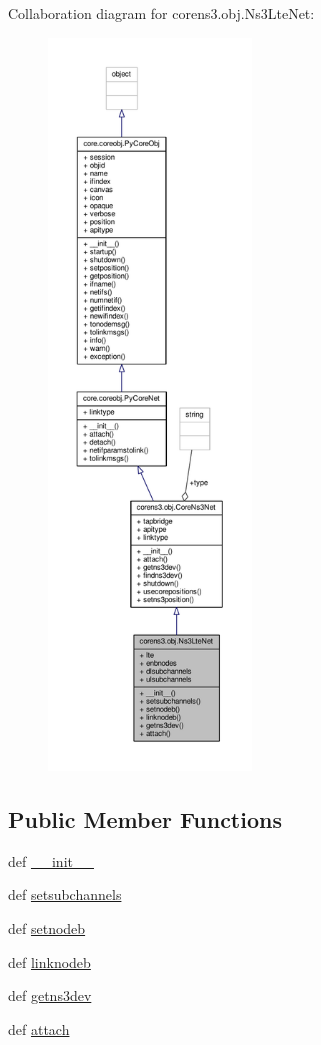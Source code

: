 Collaboration diagram for corens3.\+obj.\+Ns3\+Lte\+Net\+:
\nopagebreak
\begin{figure}[H]
\begin{center}
\leavevmode
\includegraphics[height=550pt]{classcorens3_1_1obj_1_1_ns3_lte_net__coll__graph}
\end{center}
\end{figure}
\subsection*{Public Member Functions}
\begin{DoxyCompactItemize}
\item 
def \hyperlink{classcorens3_1_1obj_1_1_ns3_lte_net_ade8e6f276c7eaef222099da702337326}{\+\_\+\+\_\+init\+\_\+\+\_\+}
\item 
def \hyperlink{classcorens3_1_1obj_1_1_ns3_lte_net_a089d785e1d81209a0b3665ccbb051e92}{setsubchannels}
\item 
def \hyperlink{classcorens3_1_1obj_1_1_ns3_lte_net_a202b7b680624537543c6248bb04267b7}{setnodeb}
\item 
def \hyperlink{classcorens3_1_1obj_1_1_ns3_lte_net_a92ba33134aa654157838561c76135c65}{linknodeb}
\item 
def \hyperlink{classcorens3_1_1obj_1_1_ns3_lte_net_a450ba59ca15c8560ec037f656a3209cf}{getns3dev}
\item 
def \hyperlink{classcorens3_1_1obj_1_1_ns3_lte_net_a13d7f2f715512f85edb47ab563e2395d}{attach}
\end{DoxyCompactItemize}
